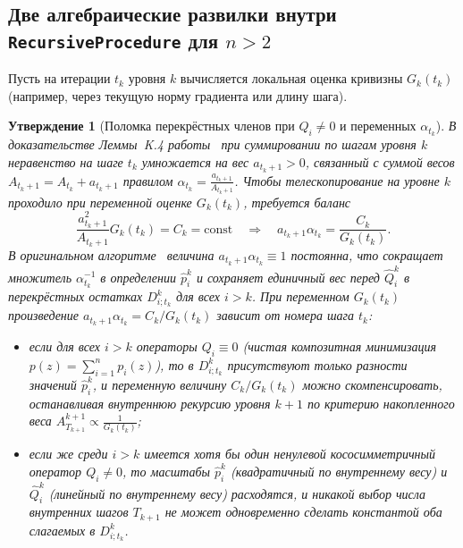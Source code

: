 \documentclass[11pt, a4paper]{article}
\newtheorem{proposition}{Утверждение}[section]
\theoremstyle{definition}
\begin{document}
\subsection{Две алгебраические развилки внутри \texttt{RecursiveProcedure} для $n > 2$}

Пусть на итерации $t_k$ уровня $k$ вычисляется локальная оценка кривизны $G_k(t_k)$ (например, через текущую норму градиента или длину шага).

\begin{proposition}[Поломка перекрёстных членов при $Q_i \neq 0$ и переменных $\alpha_{t_k}$]\label{prop:obstruction_Qi}
В доказательстве Леммы~K.4 работы~\cite{Borodich2025} при суммировании по шагам уровня $k$ неравенство на шаге $t_k$ умножается на вес $a_{t_k + 1} > 0$, связанный с суммой весов $A_{t_k + 1} = A_{t_k} + a_{t_k + 1}$ правилом $\alpha_{t_k} = \frac{a_{t_k + 1}}{A_{t_k + 1}}$. Чтобы телескопирование на уровне $k$ проходило при переменной оценке $G_k(t_k)$, требуется баланс
\begin{equation}\label{eq:variable_alpha_balance}
\frac{a_{t_k + 1}^2}{A_{t_k + 1}} G_k(t_k) = C_k = \mathrm{const} \quad \Longrightarrow \quad a_{t_k + 1} \alpha_{t_k} = \frac{C_k}{G_k(t_k)}.
\end{equation}
В оригинальном алгоритме~\cite{Borodich2025} величина $a_{t_k + 1} \alpha_{t_k} \equiv 1$ постоянна, что сокращает множитель $\alpha_{t_k}^{-1}$ в определении $\hat{p}_i^k$ и сохраняет единичный вес перед $\hat{Q}_i^k$ в перекрёстных остатках $D_{i; t_k}^k$ для всех $i > k$. При переменном $G_k(t_k)$ произведение $a_{t_k + 1} \alpha_{t_k} = C_k / G_k(t_k)$ зависит от номера шага $t_k$:
\begin{itemize}
    \item если для всех $i > k$ операторы $Q_i \equiv 0$ (чистая композитная минимизация $p(z) = \sum_{i=1}^n p_i(z)$), то в $D_{i; t_k}^k$ присутствуют только разности значений $\hat{p}_i^k$, и переменную величину $C_k / G_k(t_k)$ можно скомпенсировать, останавливая внутреннюю рекурсию уровня $k + 1$ по критерию накопленного веса $A_{T_{k+1}}^{k+1} \propto \frac{1}{G_k(t_k)}$;
    \item если же среди $i > k$ имеется хотя бы один ненулевой кососимметричный оператор $Q_i \neq 0$, то масштабы $\hat{p}_i^k$ (квадратичный по внутреннему весу) и $\hat{Q}_i^k$ (линейный по внутреннему весу) расходятся, и никакой выбор числа внутренних шагов $T_{k+1}$ не может одновременно сделать константой оба слагаемых в $D_{i; t_k}^k$.
\end{itemize}
\end{proposition}
\end{document}
